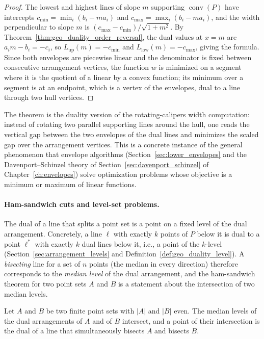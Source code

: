 \begin{proof}
  The lowest and highest lines of slope $m$ supporting
  $\operatorname{conv}(P)$ have intercepts
  $c_{\min} = \min_i (b_i - m a_i)$ and $c_{\max} = \max_i (b_i - m a_i)$,
  and the width perpendicular to slope $m$ is
  $(c_{\max} - c_{\min})/\sqrt{1 + m^2}$. By
  Theorem~\ref{thm:geo_duality_order_reversal}, the dual values at $x = m$
  are $a_i m - b_i = -c_i$, so $L_{\text{up}}(m) = -c_{\min}$ and
  $L_{\text{low}}(m) = -c_{\max}$, giving the formula. Since both envelopes
  are piecewise linear and the denominator is fixed between consecutive
  arrangement vertices, the function $w$ is minimized on a segment where it
  is the quotient of a linear by a convex function; its minimum over a
  segment is at an endpoint, which is a vertex of the envelopes, dual to a
  line through two hull vertices.
\end{proof}

The theorem is the duality version of the rotating-calipers width
computation: instead of rotating two parallel supporting lines around the
hull, one reads the vertical gap between the two envelopes of the dual
lines and minimizes the scaled gap over the arrangement vertices. This is a
concrete instance of the general phenomenon that envelope algorithms
(Section~\ref{sec:lower_envelopes} and the Davenport--Schinzel theory of
Section~\ref{sec:davenport_schinzel} of Chapter~\ref{ch:envelopes}) solve
optimization problems whose objective is a minimum or maximum of linear
functions.

\paragraph{Ham-sandwich cuts and level-set problems.}
The dual of a line that splits a point set is a point on a fixed level of
the dual arrangement. Concretely, a line $\ell$ with exactly $k$ points of
$P$ below it is dual to a point $\ell^*$ with exactly $k$ dual lines below
it, i.e., a point of the $k$-level (Section~\ref{sec:arrangement_levels}
and Definition~\ref{def:geo_duality_level}). A \emph{bisecting} line for a
set of $n$ points (the median in every direction) therefore corresponds to
the \emph{median level} of the dual arrangement, and the ham-sandwich
theorem for two point sets $A$ and $B$ is a statement about the intersection
of two median levels.

\begin{theorem}\label{thm:geo_duality_ham_sandwich}
  Let $A$ and $B$ be two finite point sets with $|A|$ and $|B|$ even. The
  median levels of the dual arrangements of $A$ and of $B$ intersect, and a
  point of their intersection is the dual of a line that simultaneously
  bisects $A$ and bisects $B$.
\end{theorem}

